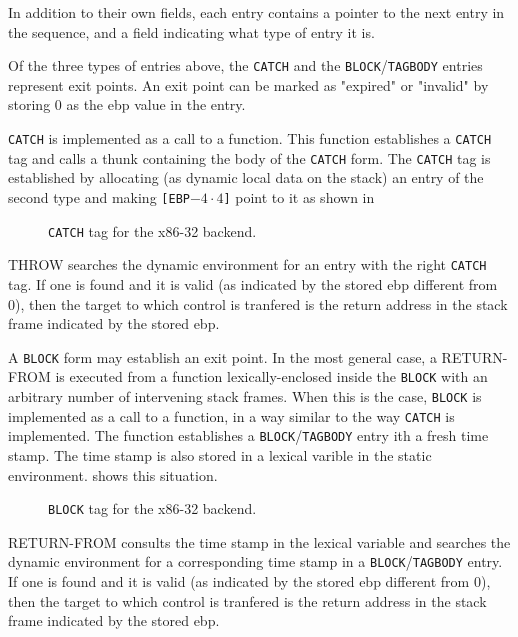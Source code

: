 In addition to their own fields, each entry contains a pointer to the
next entry in the sequence, and a field indicating what type of entry
it is.

Of the three types of entries above, the \texttt{CATCH} and the
\texttt{BLOCK}/\texttt{TAGBODY} entries represent exit points.  An
exit point can be marked as "expired" or "invalid" by storing 0 as the
ebp value in the entry.

\texttt{CATCH} is implemented as a call to a function.  This function
establishes a \texttt{CATCH} tag and calls a thunk containing the body
of the \texttt{CATCH} form.  The \texttt{CATCH} tag is established by
allocating (as dynamic local data on the stack) an entry of the second
type and making \texttt{[EBP$-4 \cdot 4$]} point to it as shown in 

\begin{figure}
\begin{center}
\end{center}
\caption{\label{fig-x86-32-catch}
\texttt{CATCH} tag for the x86-32 backend.}
\end{figure}

THROW searches the dynamic environment for an entry with the right
\texttt{CATCH} tag.  If one is found and it is valid (as indicated by
the stored ebp different from 0), then the target to which control is
tranfered is the return address in the stack frame indicated by the
stored ebp.

A \texttt{BLOCK} form may establish an exit point.  In the most
general case, a RETURN-FROM is executed from a function
lexically-enclosed inside the \texttt{BLOCK} with an arbitrary number
of intervening stack frames.  When this is the case, \texttt{BLOCK} is
implemented as a call to a function, in a way similar to the way
\texttt{CATCH} is implemented.  The function establishes a
\texttt{BLOCK}/\texttt{TAGBODY} entry ith a fresh time stamp.  The
time stamp is also stored in a lexical varible in the static
environment.   shows this situation. 

\begin{figure}
\begin{center}
\end{center}
\caption{\label{fig-x86-32-block-tag}
\texttt{BLOCK} tag for the x86-32 backend.}
\end{figure}

RETURN-FROM consults the time stamp in the lexical variable and
searches the dynamic environment for a corresponding time stamp in a
\texttt{BLOCK}/\texttt{TAGBODY} entry.  If one is found and it is
valid (as indicated by the stored ebp different from 0), then the
target to which control is tranfered is the return address in the
stack frame indicated by the stored ebp.

